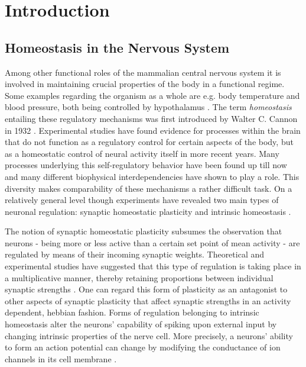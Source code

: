 \documentclass[10pt,a4paper]{article}
\begin{document}
\section{Introduction}
\subsection{Homeostasis in the Nervous System}
Among other functional roles of the mammalian central nervous system it is involved in maintaining crucial properties of the body in a functional regime. Some examples regarding the organism as a whole are e.g. body temperature and blood pressure, both being controlled by hypothalamus \cite[p. 484]{Bear_Exploring_the_Brain}. The term \textit{homeostasis} entailing these regulatory mechanisms was first introduced by Walter C. Cannon in 1932 \cite{Wisdom_of_the_Body_Cannon, Homeostasis_Queenan_2012}. Experimental studies have found evidence for processes within the brain that do not function as a regulatory control for certain aspects of the body, but as a homeostatic control of neural activity itself \cite{Turrigiano_1994,Burrone_2003}in more recent years. Many processes underlying this self-regulatory behavior have been found up till now and many different biophysical interdependencies have shown to play a role. This diversity makes comparability of these mechanisms a rather difficult task. On a relatively general level though experiments have revealed two main types of neuronal regulation: synaptic homeostatic plasticity and intrinsic homeostasis \cite{Desai_2003}. 

The notion of synaptic homeostatic plasticity subsumes the observation that neurons - being more or less active than a certain set point of mean activity - are regulated by means of their incoming synaptic weights. Theoretical and experimental studies have suggested that this type of regulation is taking place in a multiplicative manner, thereby retaining proportions between individual synaptic strengths \cite{Syn_Plast_Abbott}. One can regard this form of plasticity as an antagonist to other aspects of synaptic plasticity that affect synaptic strengths in an activity dependent, hebbian fashion. Forms of regulation belonging to intrinsic homeostasis alter the neurons' capability of spiking upon external input by changing intrinsic properties of the nerve cell. More precisely, a neurons' ability to form an action potential can change by modifying the conductance of ion channels in its cell membrane \cite[p. 156]{Theor_Neur_Dayan}.
\end{document}

